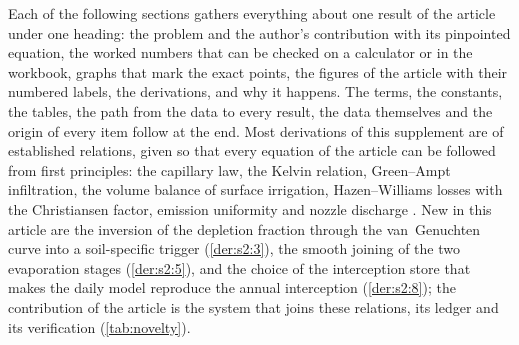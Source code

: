 Each of the following sections gathers everything about one result of the article under one heading: the problem and the author's contribution with its pinpointed equation, the worked numbers that can be checked on a calculator or in the workbook, graphs that mark the exact points, the figures of the article with their numbered labels, the derivations, and why it happens. The terms, the constants, the tables, the path from the data to every result, the data themselves and the origin of every item follow at the end. Most derivations of this supplement are of established relations, given so that every equation of the article can be followed from first principles: the capillary law, the Kelvin relation, Green--Ampt infiltration, the volume balance of surface irrigation, Hazen--Williams losses with the Christiansen factor, emission uniformity and nozzle discharge \citep{GreenAmpt1911,Walker1987,Christiansen1942,KellerKarmeli1974}. New in this article are the inversion of the depletion fraction through the van~Genuchten curve into a soil-specific trigger (\ref{der:s2:3}), the smooth joining of the two evaporation stages (\ref{der:s2:5}), and the choice of the interception store that makes the daily model reproduce the annual interception (\ref{der:s2:8}); the contribution of the article is the system that joins these relations, its ledger and its verification (\cref{tab:novelty}).
